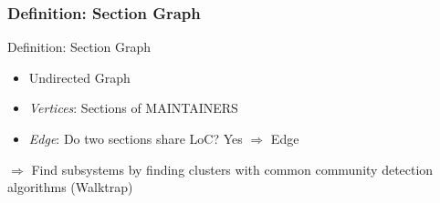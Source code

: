 \documentclass{beamer}
\begin{document}
	\begin{frame}
	\frametitle{Definition: Section Graph}
		\begin{alertblock}{Definition: Section Graph}
			\begin{itemize}
				\item Undirected Graph
				\item \textit{Vertices}: Sections of MAINTAINERS
				\item \textit{Edge}: Do two sections share LoC? Yes $\Rightarrow$ Edge
			\end{itemize}
		\end{alertblock}

		$\Rightarrow$ Find subsystems by finding clusters with common community detection algorithms (Walktrap) %
	\end{frame}
\end{document}
